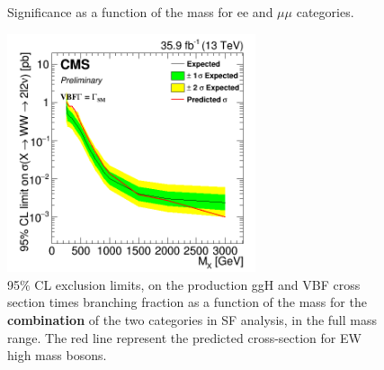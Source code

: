 \begin{figure}[htb]
\centering
{}

\caption{Significance as a function of the mass for ee and $\mu \mu$ categories.}
    \label{fig:sig_SF}
\end{figure}
    


\begin{figure}[htb]
\centering
\includegraphics[width=0.65\textwidth]{Figs/Limits_SF/c2_comb.png}
\caption{95$\%$ CL exclusion limits,  on the production ggH and VBF cross section times branching fraction as a function of the mass for the { \bf combination} of the two categories in SF analysis, in the full mass range.   The red  line represent the predicted cross-section for EW high mass bosons.}
    \label{fig:sig_SF_comb}
\end{figure}




